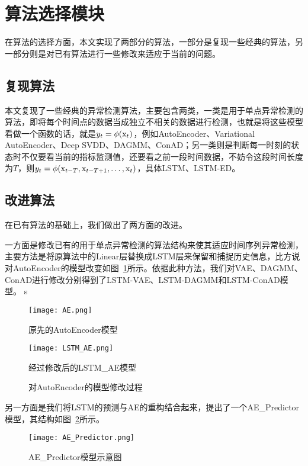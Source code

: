 \section{算法选择模块}
在算法的选择方面，本文实现了两部分的算法，一部分是复现一些经典的算法，另一部分则是对已有算法进行一些修改来适应于当前的问题。
\subsection{复现算法}
本文复现了一些经典的异常检测算法，主要包含两类，一类是用于单点异常检测的算法，即将每个时间点的数据当成独立不相关的数据进行检测，也就是将这些模型看做一个函数的话，就是$y_t = \phi ({\rm x}_t)$，例如AutoEncoder、Variational AutoEncoder\cite{an2015variational}、Deep SVDD\cite{ruff2018deep}、DAGMM\cite{zong2018deep}、ConAD\cite{nguyen2018anomaly}；另一类则是判断每一时刻的状态时不仅要看当前的指标监测值，还要看之前一段时间数据，不妨令这段时间长度为$T$，则$y_t = \phi({\rm x}_{t-T},{\rm x}_{t-T+1},\dots,{\rm x}_{t})$，具体LSTM、LSTM-ED\cite{malhotra2016lstm}。
\subsection{改进算法}
在已有算法的基础上，我们做出了两方面的改进。

一方面是修改已有的用于单点异常检测的算法结构来使其适应时间序列异常检测，主要方法是将原算法中的Linear层替换成LSTM层来保留和捕捉历史信息，比方说对AutoEncoder的模型改变如图~\ref{fig:lstm_ae}所示。依据此种方法，我们对VAE、DAGMM、ConAD进行修改分别得到了LSTM-VAE、LSTM-DAGMM和LSTM-ConAD模型。
s
\begin{figure}[htbp]
  \begin{minipage}[t]{0.5\linewidth}
  \centering
  \texttt{[image: AE.png]}
  \caption*{原先的AutoEncoder模型}
  \end{minipage}
  \begin{minipage}[t]{0.5\linewidth}
  \centering
  \texttt{[image: LSTM\_AE.png]}
  \caption*{经过修改后的LSTM\_AE模型}
  \end{minipage}
  \caption{对AutoEncoder的模型修改过程}
  \label{fig:lstm_ae}
\end{figure}

另一方面是我们将LSTM的预测与AE的重构结合起来，提出了一个AE\_Predictor模型，其结构如图~\ref{fig:AE_Predictor}所示。

\begin{figure}[htbp]
  \centering
  \texttt{[image: AE\_Predictor.png]}
  \caption{AE\_Predictor模型示意图}
  \label{fig:AE_Predictor}
\end{figure}


